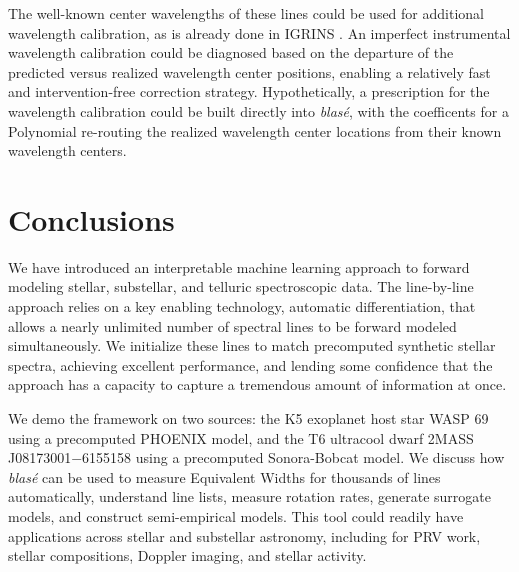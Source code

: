 \documentclass[twocolumn]{aastex631}
\begin{document}
The well-known center wavelengths of these lines could be used for additional wavelength calibration, as is already done in IGRINS \citep{jaejoonlee16}.  An imperfect instrumental wavelength calibration could be diagnosed based on the departure of the predicted versus realized wavelength center positions, enabling a relatively fast and intervention-free correction strategy.  Hypothetically, a prescription for the wavelength calibration could be built directly into \emph{blas\'e}, with the coefficents for a Polynomial re-routing the realized wavelength center locations from their known wavelength centers.


\section{Conclusions}
We have introduced an interpretable machine learning approach to forward modeling stellar, substellar, and telluric spectroscopic data.  The line-by-line approach relies on a key enabling technology, automatic differentiation, that allows a nearly unlimited number of spectral lines to be forward modeled simultaneously.  We initialize these lines to match precomputed synthetic stellar spectra, achieving excellent performance, and lending some confidence that the approach has a capacity to capture a tremendous amount of information at once.

We demo the framework on two sources: the K5 exoplanet host star WASP 69 using a precomputed PHOENIX model, and the T6 ultracool dwarf 2MASS J08173001$-$6155158 using a precomputed Sonora-Bobcat model.  We discuss how  \emph{blas\'e} can be used to measure Equivalent Widths for thousands of lines automatically, understand line lists, measure rotation rates, generate surrogate models, and construct semi-empirical models.  This tool could readily have applications across stellar and substellar astronomy, including for PRV work, stellar compositions, Doppler imaging, and stellar activity.

\pagebreak
\newpage
\end{document}
